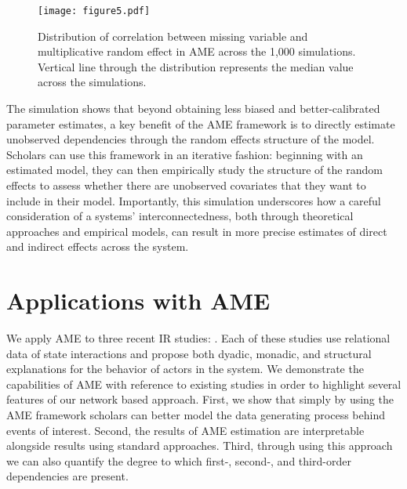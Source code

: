 \documentclass[12pt]{amsart}
\begin{document}
\begin{figure}
	\centering
	\caption{Distribution of correlation between missing variable and multiplicative random effect in AME across the 1,000 simulations. Vertical line through the distribution represents the median value across the simulations.}
	\label{fig:ameCorr}
	\texttt{[image: figure5.pdf]} \\
\end{figure}

The simulation shows that beyond obtaining less biased and better-calibrated parameter estimates, a key benefit of the AME framework is to directly estimate unobserved dependencies through the random effects structure of the model. Scholars can use this framework in an iterative fashion: beginning with an estimated model, they can then empirically study the structure of the random effects to assess whether there are unobserved covariates that they want to include in their model. Importantly, this simulation underscores how a careful consideration of a systems' interconnectedness, both through theoretical approaches and empirical models, can result in more precise estimates of direct and indirect effects across the system.

\section{\textbf{Applications with AME}}

We apply AME to three recent IR studies: \citet{reiter:stam:2003, weeks:2012, gibler:2017}. Each of these studies use relational data of state interactions and propose both dyadic, monadic, and structural explanations for the behavior of actors in the system. We demonstrate the capabilities of AME with reference to existing studies in order to highlight several features of our network based approach. First, we show that simply by using the AME framework scholars can better model the data generating process behind events of interest. Second, the results of AME estimation are interpretable alongside results using standard approaches. Third, through using this approach we can also quantify the degree to which first-, second-, and third-order dependencies are present.
\end{document}
